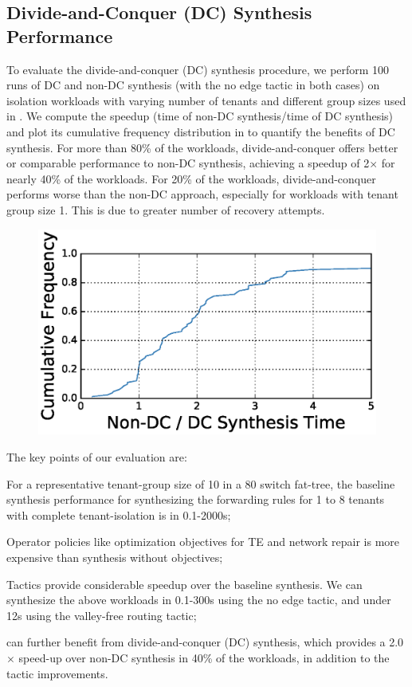 \subsection{Divide-and-Conquer (DC) Synthesis Performance} \label{sec:optimisticeval} 
To evaluate the divide-and-conquer (DC) synthesis procedure, we
perform 100 runs of DC and non-DC synthesis 
(with the no edge tactic in both cases) on isolation
workloads with varying number of tenants and different group sizes
used in . We compute the
speedup (time of non-DC synthesis/time of DC synthesis) and plot its
cumulative frequency distribution in  to quantify
the benefits of DC synthesis. For more than 80\% of the
workloads, divide-and-conquer offers better or comparable
performance to non-DC synthesis, achieving a speedup of
2$\times$ for nearly 40\% of the workloads. For 20\% of the workloads,
divide-and-conquer performs worse than the non-DC approach,
especially for workloads with tenant group size 1.  This is due to
greater number of recovery attempts. 
\begin{figure}
	\centering
	\includegraphics[width=0.65\columnwidth]{figures/dcSynthesis.eps}
	\label{fig:dcsyn-cdf}
\end{figure}


 The key points of our evaluation are:
\begin{compactitemize}
\item For a representative tenant-group size of 10 in a 80 switch
  fat-tree, the baseline synthesis performance for synthesizing the
  forwarding rules for 1 to 8 tenants with complete tenant-isolation
  is in 0.1-2000s;
   \item Operator policies like optimization objectives for TE and  
   network repair is more expensive than synthesis without
   objectives;
      \item Tactics provide considerable speedup over the
        baseline synthesis.  We can
        synthesize the above workloads in 0.1-300s using the no edge
        tactic, and under 12s using the valley-free routing tactic;
      \item \Name can further benefit from 
        divide-and-conquer (DC) synthesis, which provides a 2.0$\times$ speed-up
        over non-DC synthesis in 40\% of the workloads, in
        addition to the tactic improvements.
\end{compactitemize}


